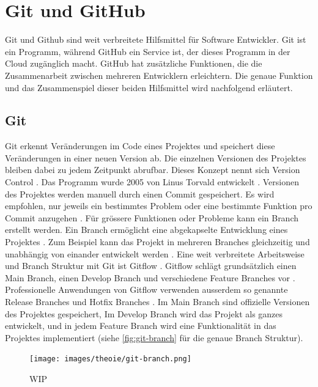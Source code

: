 \section{Git und GitHub}\label{chap:t_git} Git und Github sind weit verbreitete
Hilfsmittel für Software Entwickler. Git ist ein Programm, während GitHub ein
Service ist, der dieses Programm in der Cloud zugänglich macht. GitHub hat
zusätzliche Funktionen, die die Zusammenarbeit zwischen mehreren Entwicklern
erleichtern. Die genaue Funktion und das Zusammenspiel dieser beiden Hilfsmittel
wird nachfolgend erläutert.

\subsection{Git}\label{sub:t_git_git} Git erkennt Veränderungen im Code eines
Projektes und speichert diese Veränderungen in einer neuen Version ab. Die
einzelnen Versionen des Projektes bleiben dabei zu jedem Zeitpunkt abrufbar.
Dieses Konzept nennt sich Version Control
\cite{atlassian_git-flow-workflow_nodate}. Das Programm wurde 2005 von Linus
Torvald entwickelt \cite{noauthor_git_2021}. Versionen des Projektes werden
manuell durch einen Commit gespeichert. Es wird empfohlen, nur jeweils ein
bestimmtes Problem oder eine bestimmte Funktion pro Commit anzugehen
\cite{noauthor_5_nodate}. Für grössere Funktionen oder Probleme kann ein Branch
erstellt werden. Ein Branch ermöglicht eine abgekapselte Entwicklung eines
Projektes \cite{guillermo_brachetta_what_2022}. Zum Beispiel kann das Projekt in
mehreren Branches gleichzeitig und unabhängig von einander entwickelt werden
\cite{guillermo_brachetta_what_2022}. Eine weit verbreitete Arbeitsweise und
Branch Struktur mit Git ist Gitflow \cite{noauthor_what_2022}. Gitflow schlägt
grundsätzlich einen Main Branch, einen Develop Branch und verschiedene Feature
Branches vor \cite{atlassian_git-flow-workflow_nodate}. Professionelle
Anwendungen von Gitflow verwenden ausserdem so genannte Release Branches und
Hotfix Branches \cite{cameron_mckenzie_gitflow_2021}. Im Main Branch sind
offizielle Versionen des Projektes gespeichert, Im Develop Branch wird das
Projekt als ganzes entwickelt, und in jedem Feature Branch wird eine
Funktionalität in das Projektes implementiert (siehe \autoref{fig:git-branch}
für die genaue Branch Struktur). 

\begin{figure}[!ht]
    \centering
    \texttt{[image: images/theoie/git-branch.png]}
    \caption{WIP}
    \label{fig:git-branch}
\end{figure}

